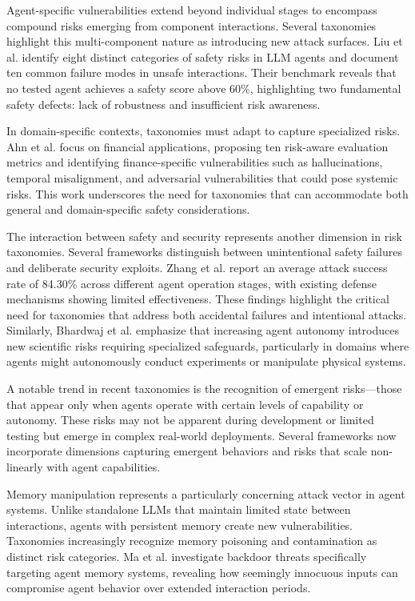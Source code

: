 \documentclass[conference]{IEEEtran}
\begin{document}
Agent-specific vulnerabilities extend beyond individual stages to encompass compound risks emerging from component interactions. Several taxonomies highlight this multi-component nature as introducing new attack surfaces. Liu et al. \cite{2412.14470} identify eight distinct categories of safety risks in LLM agents and document ten common failure modes in unsafe interactions. Their benchmark reveals that no tested agent achieves a safety score above 60\%, highlighting two fundamental safety defects: lack of robustness and insufficient risk awareness.

In domain-specific contexts, taxonomies must adapt to capture specialized risks. Ahn et al. \cite{2502.15865} focus on financial applications, proposing ten risk-aware evaluation metrics and identifying finance-specific vulnerabilities such as hallucinations, temporal misalignment, and adversarial vulnerabilities that could pose systemic risks. This work underscores the need for taxonomies that can accommodate both general and domain-specific safety considerations.

The interaction between safety and security represents another dimension in risk taxonomies. Several frameworks distinguish between unintentional safety failures and deliberate security exploits. Zhang et al. \cite{2410.02644} report an average attack success rate of 84.30\% across different agent operation stages, with existing defense mechanisms showing limited effectiveness. These findings highlight the critical need for taxonomies that address both accidental failures and intentional attacks. Similarly, Bhardwaj et al. \cite{2402.04247} emphasize that increasing agent autonomy introduces new scientific risks requiring specialized safeguards, particularly in domains where agents might autonomously conduct experiments or manipulate physical systems.

A notable trend in recent taxonomies is the recognition of emergent risks—those that appear only when agents operate with certain levels of capability or autonomy. These risks may not be apparent during development or limited testing but emerge in complex real-world deployments. Several frameworks now incorporate dimensions capturing emergent behaviors and risks that scale non-linearly with agent capabilities.

Memory manipulation represents a particularly concerning attack vector in agent systems. Unlike standalone LLMs that maintain limited state between interactions, agents with persistent memory create new vulnerabilities. Taxonomies increasingly recognize memory poisoning and contamination as distinct risk categories. Ma et al. \cite{2402.11208} investigate backdoor threats specifically targeting agent memory systems, revealing how seemingly innocuous inputs can compromise agent behavior over extended interaction periods.
\end{document}
